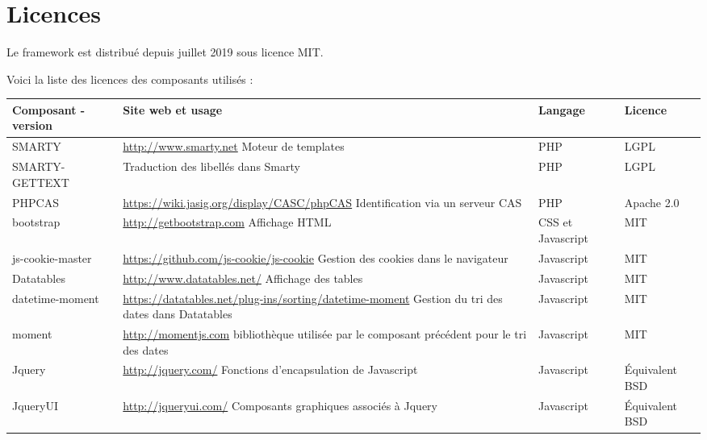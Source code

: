 \section{Licences}

Le framework est distribué depuis juillet 2019 sous licence MIT.

Voici la liste des licences des composants utilisés :


\begin{longtable}{|>{\raggedright\arraybackslash}p{2cm}|>{\raggedright\arraybackslash}p{6cm}|>{\raggedright\arraybackslash}p{1.5cm}|>{\raggedright\arraybackslash}p{2cm}|}
\hline
\textbf{Composant - version} & \textbf{Site web et usage} & \textbf{Langage} & \textbf{Licence} \\

\hline
\endhead
\hline\endfoot
SMARTY & \url{http://www.smarty.net} Moteur de templates & PHP & LGPL \\

SMARTY-GETTEXT & Traduction des libellés dans Smarty & PHP & LGPL \\



PHPCAS & \url{https://wiki.jasig.org/display/CASC/phpCAS} Identification via un serveur CAS & PHP & Apache 2.0\\

bootstrap & \url{http://getbootstrap.com} Affichage HTML & CSS et Javascript &  MIT\\

js-cookie-master & \url{https://github.com/js-cookie/js-cookie} Gestion des cookies dans le navigateur & Javascript & MIT \\

Datatables & \url{http://www.datatables.net/} Affichage des tables & Javascript & MIT \\

datetime-moment & \url{https://datatables.net/plug-ins/sorting/datetime-moment} Gestion du tri des dates dans Datatables & Javascript & MIT\\

moment & \url{http://momentjs.com} bibliothèque utilisée par le composant précédent pour le tri des dates & Javascript & MIT\\

Jquery & \url{http://jquery.com/} Fonctions d'encapsulation de Javascript & Javascript & Équivalent BSD \\

JqueryUI & \url{http://jqueryui.com/} Composants graphiques associés à Jquery & Javascript & Équivalent BSD \\


\end{longtable}
